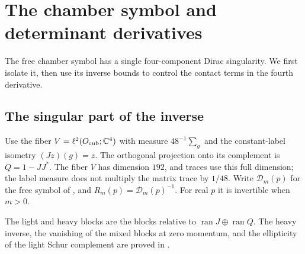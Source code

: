 \section{The chamber symbol and determinant derivatives}\label{subsec:response-bloch}\label{sec:free-response}

The free chamber symbol has a single four-component Dirac singularity.
We first isolate it, then use its inverse bounds to control the contact
terms in the fourth derivative.

\subsection{The singular part of the inverse}

Use the fiber $V=\ell^2(O_{\mathrm{cub}};\mathbb C^4)$ with measure
$48^{-1}\sum_g$ and the constant-label isometry $(Jz)(g)=z$.
The orthogonal projection onto its complement is $Q=1-JJ^*$.
The fiber $V$ has dimension $192$, and traces use this full dimension;
the label measure does not multiply the matrix trace by
$1/48$. Write $\mathcal D_m(p)$ for the free symbol of
\cite[\S2.2]{FermionBlock}, and $R_m(p)=\mathcal D_m(p)^{-1}$.
For real $p$ it is invertible when $m>0$.

The light and heavy blocks are the blocks relative to
$\operatorname{ran}J\oplus\operatorname{ran}Q$. The heavy inverse,
the vanishing of the mixed blocks at zero momentum, and the
ellipticity of the light Schur complement are proved in
\cite[Proposition~2.2]{FermionBlock}.

